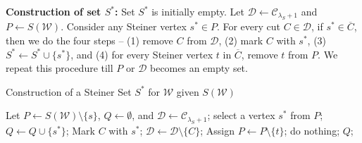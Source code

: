 \documentclass[letterpaper,11pt]{article}
\begin{document}
\noindent
\textbf{Construction of set $S^*$:} Set $S^*$ is initially empty. Let ${\mathcal D}\gets {\mathcal C}_{\lambda_S+1}$ and $P\gets S({\mathcal W})$. Consider any Steiner vertex $s^*\in P$. For every cut $C\in {\mathcal D}$, if $s^*\in \overline{C}$, then we do the four steps -- (1) remove $C$ from ${\mathcal D}$, (2) mark $C$ with $s^*$, (3) $S^*\gets S^*\cup \{s^*\}$, and (4) for every Steiner vertex $t$ in $\overline{C}$, remove $t$ from $P$. We repeat this procedure till $P$ or ${\mathcal D}$ becomes an empty set.\\

\begin{algorithm}[h]
\caption{Construction of a Steiner Set $S^*$ for ${\mathcal W}$ given $S({\mathcal W})$}
\label{alg : constructing S*}
\begin{algorithmic}[1]
    \State Let $P\gets S({\mathcal W})\setminus \{s\}$, $Q\gets \emptyset$, and ${\mathcal D}\gets {\mathcal C}_{\lambda_S+1}$;
    \State select a vertex $s^*$ from $P$;
    \State $Q\gets Q\cup \{s^*\}$;
            \State Mark $C$ with $s^*$;
            \State ${\mathcal D}\gets {\mathcal D}\setminus \{C\}$;
                \State Assign $P\gets P\setminus \{t\}$;
            \EndFor
            \Else \State do nothing;
        \EndIf
    \EndFor
    \EndWhile
    \State \Return $Q$;
\EndProcedure
\end{algorithmic}
\end{algorithm}
\end{document}
